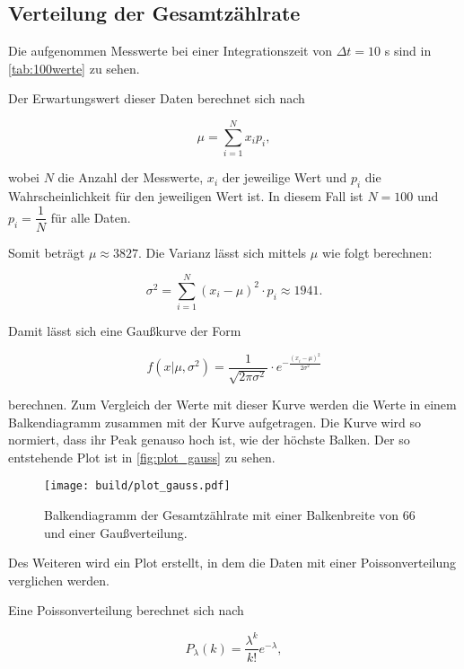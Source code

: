 \subsection{Verteilung der Gesamtzählrate}

Die aufgenommen Messwerte bei einer Integrationszeit von $\Delta t = 10$ s sind in \autoref{tab:100werte} zu sehen.



Der Erwartungswert dieser Daten berechnet sich nach

\begin{equation}
    \mu = \sum_{i=1}^{N} x_i p_i,
\end{equation}

wobei $N$ die Anzahl der Messwerte, $x_i$ der jeweilige Wert und $p_i$ die Wahrscheinlichkeit für den jeweiligen Wert ist.
In diesem Fall ist $N = 100$ und $p_i = \dfrac{1}{N}$ für alle Daten.

Somit beträgt $\mu \approx 3827$.
Die Varianz lässt sich mittels $\mu$ wie folgt berechnen:

\begin{equation}
    \sigma^2 = \sum_{i=1}^{N} (x_i - \mu)^2 \cdot p_i \approx 1941.
\end{equation}

Damit lässt sich eine Gaußkurve der Form

\begin{equation}
    f(x | \mu, \sigma^2) = \frac{1}{\sqrt{2 \pi \sigma^2}} \cdot e^{- \frac{(x_i - \mu)^2}{2 \sigma^2}}
\end{equation}

berechnen. Zum Vergleich der Werte mit dieser Kurve werden die Werte in einem Balkendiagramm zusammen mit der Kurve aufgetragen.
Die Kurve wird so normiert, dass ihr Peak genauso hoch ist, wie der höchste Balken. Der so entstehende Plot ist in \autoref{fig:plot_gauss} zu sehen.

\begin{figure}
    \centering
    \texttt{[image: build/plot\_gauss.pdf]}
    \caption{Balkendiagramm der Gesamtzählrate mit einer Balkenbreite von 66 und einer Gaußverteilung.}
    \label{fig:plot_gauss}
\end{figure}

Des Weiteren wird ein Plot erstellt, in dem die Daten mit einer Poissonverteilung verglichen werden.

Eine Poissonverteilung berechnet sich nach

\begin{equation}
    P_\lambda (k) = \frac{\lambda^k}{k!} e^{-\lambda},
\end{equation}

